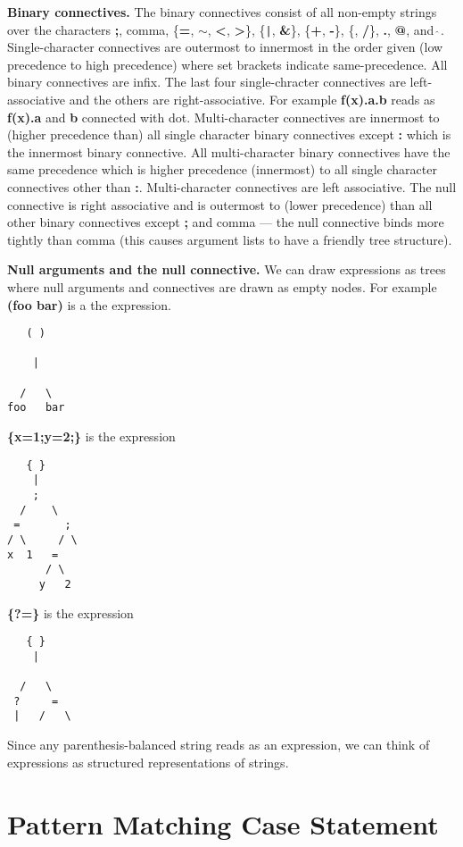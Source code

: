 \documentclass{article}
\newcommand{\mtt}[1]{\mbox{\tt #1}}
\begin{document}
{\bf Binary connectives.} The binary connectives consist of all non-empty strings over the characters {\bf ;}, comma, \{{\bf =}, {\bf $\sim$}, {\bf <}, {\bf >}\}, \{\mtt{|}, {\bf \&}\}, \{{\bf +},
{\bf -}\}, \{{\bf *}, {\bf /}\}, {\bf .}, {\bf @}, and \mtt{$\hat{~}$}.
Single-character connectives are outermost to innermost in the order given (low
precedence to high precedence) where set brackets indicate same-precedence.    All binary connectives are infix.  The last four single-chracter connectives are left-associative and the
others are right-associative. For example {\bf f(x).a.b} reads as {\bf f(x).a} and {\bf b} connected with dot.  Multi-character connectives are
innermost to (higher precedence than) all single character binary connectives except {\bf :} which is the innermost binary connective. All multi-character binary connectives have the same
precedence which is higher precedence (innermost) to all single character connectives other than {\bf :}.  Multi-character connectives are left associative.  The null connective is right associative and is outermost to (lower precedence) than all other binary connectives
except {\bf;} and comma --- the null connective binds more tightly than comma (this causes argument lists to have a friendly tree structure).

{\bf Null arguments and the null connective.}  We can draw expressions as trees where null arguments and connectives are drawn as empty nodes.
For example {\bf (foo bar)} is a the expression.
\begin{verbatim}
   ( )

    |
      
  /   \
foo   bar
\end{verbatim}
  
{\bf \{x=1;y=2;\}} is the expression
\begin{verbatim}
   { }
    |
    ;   
  /    \
 =       ;
/ \     / \
x  1   =
      / \
     y   2
\end{verbatim}
{\bf \{?=\}} is  the expression
\begin{verbatim}
   { }
    |

  /   \
 ?     =
 |   /   \
\end{verbatim}
Since any parenthesis-balanced string reads as an expression, we can think of expressions as structured representations of strings.
\section{Pattern Matching Case Statement}
\end{document}
